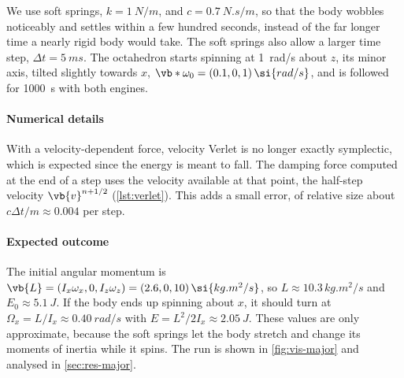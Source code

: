 \begin{sloppypar} %
We use soft springs, $k=\SI{1}{N/m}$, and $c=\SI{0.7}{N.s/m}$, so that the body wobbles noticeably and settles within a few hundred seconds, instead of the far longer time a nearly rigid body would take.
The soft springs also allow a larger time step, $\Delta t=\SI{5}{ms}$.
The octahedron starts spinning at \SI{1}{rad/s} about $z$, its minor axis, tilted slightly towards $x$, $\vb*{\omega}_0=(0.1,0,1)\,\si{rad/s}$, and is followed for \SI{1000}{s} with both engines.

\paragraph{Numerical details}
With a velocity-dependent force, velocity Verlet is no longer exactly symplectic, which is expected since the energy is meant to fall.
The damping force computed at the end of a step uses the velocity available at that point, the half-step velocity $\vb{v}^{n+1/2}$ (\cref{lst:verlet}).
This adds a small error, of relative size about $c\Delta t/m\approx0.004$ per step.
\end{sloppypar}

\paragraph{Expected outcome}
The initial angular momentum is $\vb{L}=(I_x\omega_x,0,I_z\omega_z)=(2.6,0,10)\,\si{kg.m^2/s}$, so $L\approx10.3\,\si{kg.m^2/s}$ and $E_0\approx\SI{5.1}{J}$.
If the body ends up spinning about $x$, it should turn at $\Omega_x=L/I_x\approx\SI{0.40}{rad/s}$ with $E=L^2/2I_x\approx\SI{2.05}{J}$.
These values are only approximate, because the soft springs let the body stretch and change its moments of inertia while it spins.
The run is shown in \cref{fig:vis-major} and analysed in \cref{sec:res-major}.
